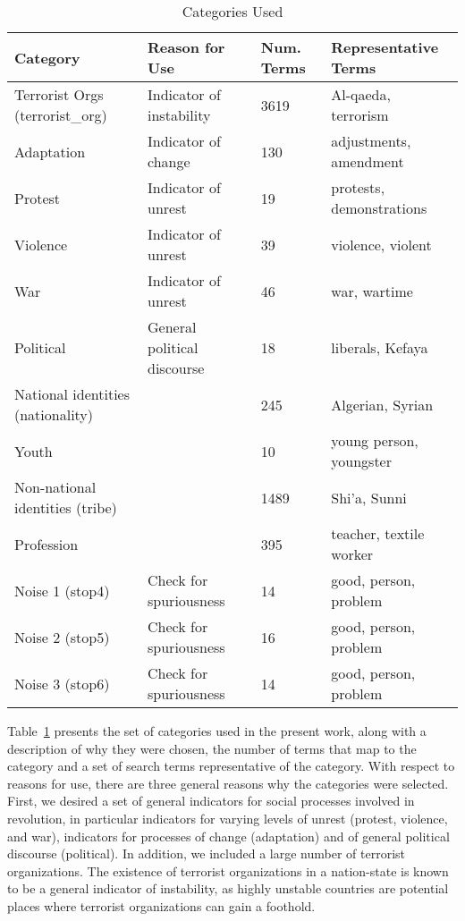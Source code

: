 \begin{table}[ht]
\begin{tabularx}{\textwidth}{| m{3.5cm} | m{4.5cm} | m{1.5cm} | X |}
	\hline 
	{\bf Category} & {\bf Reason for Use} & {\bf Num. Terms} & {\bf Representative Terms} \\ \hline
	  Terrorist Orgs (terrorist\_org) & Indicator of instability & 3619 & Al-qaeda, terrorism \\ \hline
	   Adaptation & Indicator of change & 130 & adjustments,  amendment \\ \hline
      Protest &  Indicator of unrest & 19 & protests, demonstrations \\ \hline
   Violence & Indicator of unrest & 39 & violence, violent \\ \hline
    War & Indicator of unrest & 46 &  war, wartime \\ \hline
    Political &  General political discourse & 18 & liberals, Kefaya \\ \hline
    National identities (nationality) & \cite{goldstone_cross-class_2011}& 245 & Algerian, Syrian \\ \hline  
   Youth & \cite{goldstone_cross-class_2011} &   10 & young person, youngster \\ \hline
   Non-national identities (tribe) & \cite{goldstone_cross-class_2011} & 1489 & Shi'a, Sunni \\ \hline
  Profession & \cite{goldstone_cross-class_2011} &  395 & teacher, textile worker \\ \hline
   Noise 1 (stop4) & Check for spuriousness & 14 & good, person, problem  \\ \hline
 Noise 2 (stop5) & Check for spuriousness & 16 & good, person, problem \\ \hline
 Noise 3 (stop6) & Check for spuriousness & 14 & good, person, problem\\ \hline
\end{tabularx}
	\caption{Categories Used}
	\label{tab:categories}
\end{table}

Table~\ref{tab:categories} presents the set of categories used in the present work, along with a description of why they were chosen, the number of terms that map to the category and a set of search terms representative of the category.  With respect to reasons for use, there are three general reasons why the categories were selected. First, we desired a set of general indicators for social processes involved in revolution, in particular indicators for varying levels of unrest (protest, violence, and war), indicators for processes of change (adaptation) and of general political discourse (political).  In addition, we included a large number of terrorist organizations.  The existence of terrorist organizations in a nation-state is known to be a general indicator of instability, as highly unstable countries are potential places where terrorist organizations can gain a foothold.  

